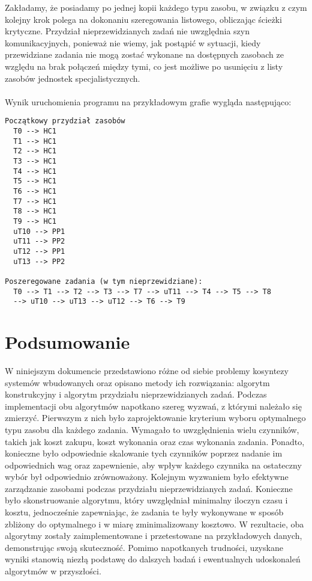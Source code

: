 \documentclass[a4paper,11pt]{article}
\begin{document}
Zakładamy, że posiadamy po jednej kopii każdego typu zasobu, 
w związku z czym kolejny krok polega na dokonaniu szeregowania listowego, 
obliczając ścieżki krytyczne. Przydział nieprzewidzianych zadań nie uwzględnia
szyn komunikacyjnych, ponieważ nie wiemy, jak postąpić w sytuacji, kiedy
przewidziane zadania nie mogą zostać wykonane na dostępnych zasobach ze względu
na brak połączeń między tymi, co jest możliwe po usunięciu z listy zasobów 
jednostek specjalistycznych. 
\\\\
Wynik uruchomienia programu na przykładowym grafie wygląda następująco:

\begin{verbatim}
Początkowy przydział zasobów
  T0 --> HC1
  T1 --> HC1
  T2 --> HC1
  T3 --> HC1
  T4 --> HC1
  T5 --> HC1
  T6 --> HC1
  T7 --> HC1
  T8 --> HC1
  T9 --> HC1
  uT10 --> PP1
  uT11 --> PP2
  uT12 --> PP1
  uT13 --> PP2

Poszeregowane zadania (w tym nieprzewidziane):
  T0 --> T1 --> T2 --> T3 --> T7 --> uT11 --> T4 --> T5 --> T8 
  --> uT10 --> uT13 --> uT12 --> T6 --> T9
\end{verbatim}

\section{Podsumowanie}
W niniejszym dokumencie przedstawiono różne od siebie problemy kosyntezy systemów 
wbudowanych oraz opisano metody ich rozwiązania: algorytm konstrukcyjny i algorytm 
przydziału nieprzewidzianych zadań. Podczas implementacji obu algorytmów napotkano 
szereg wyzwań, z którymi należało się zmierzyć. Pierwszym z nich było zaprojektowanie 
kryterium wyboru optymalnego typu zasobu dla każdego zadania. Wymagało to 
uwzględnienia wielu czynników, takich jak koszt zakupu, koszt wykonania oraz 
czas wykonania zadania. Ponadto, konieczne było odpowiednie skalowanie tych 
czynników poprzez nadanie im odpowiednich wag oraz zapewnienie, aby wpływ każdego 
czynnika na ostateczny wybór był odpowiednio zrównoważony. Kolejnym wyzwaniem 
było efektywne zarządzanie zasobami podczas przydziału nieprzewidzianych zadań. 
Konieczne było skonstruowanie algorytmu, który uwzględniał minimalny iloczyn 
czasu i kosztu, jednocześnie zapewniając, że zadania te były wykonywane w sposób 
zbliżony do optymalnego i w miarę zminimalizowany kosztowo. W rezultacie, oba 
algorytmy zostały zaimplementowane i przetestowane na przykładowych danych, 
demonstrując swoją skuteczność. Pomimo napotkanych trudności, uzyskane wyniki 
stanowią niezłą podstawę do dalszych badań i ewentualnych udoskonaleń algorytmów 
w przyszłości.
\end{document}
